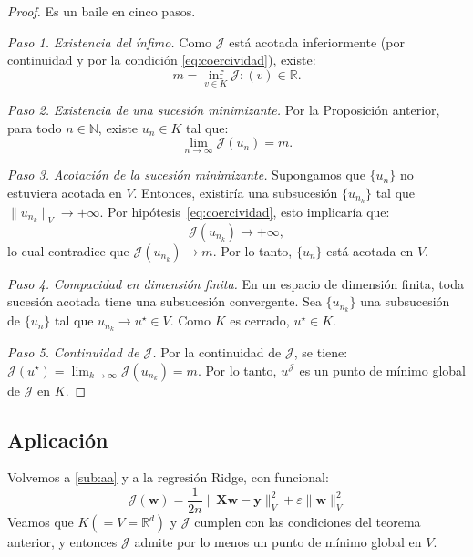 \documentclass[12pt]{book}
\theoremstyle{definition}
\theoremstyle{plain}
\theoremstyle{remark}
\begin{document}
\begin{proof} Es un baile en cinco pasos.

\medskip

\noindent \emph{Paso 1.} \emph{Existencia del ínfimo.}
   Como $\mathcal{J}$ está acotada inferiormente (por continuidad y por la condición  %
   \eqref{eq:coercividad}), existe:
   \[
   m = \inf_{v \in K} \mathcal{J}:(v) \in \mathbb{R}.
   \]

\medskip

\noindent \emph{Paso 2.}
\emph{Existencia de una sucesión minimizante.}
   Por %
   la Proposici\'on anterior, para
   todo $n \in \mathbb{N}$, existe $u_n \in K$ tal que:
   \[
   \lim_{n \to \infty} \mathcal{J}(u_n) = m.
   \]

\medskip

\noindent \emph{Paso 3.}
\emph{Acotación de la sucesión minimizante.}
   Supongamos que $\{u_n\}$ no estuviera acotada en $V$. Entonces, existiría una subsucesión $\{u_{n_k}\}$ tal que $\|u_{n_k}\|_V \to +\infty$. Por hipótesis~\eqref{eq:coercividad}, esto implicaría que:
   \[
   \mathcal{J}(u_{n_k}) \to +\infty,
   \]
   lo cual contradice que $\mathcal{J}(u_{n_k}) \to m$. Por lo tanto, $\{u_n\}$ está acotada en $V$.

\medskip

\noindent \emph{Paso 4.}
\emph{Compacidad en dimensión finita.}
   En un espacio de dimensión finita, toda sucesión acotada tiene una subsucesión convergente. Sea $\{u_{n_k}\}$ una subsucesión de $\{u_n\}$ tal que $u_{n_k} \to u^\star \in V$. Como $K$ es cerrado, $u^\star \in K$.

\medskip

\noindent \emph{Paso 5.}
\emph{Continuidad de $\mathcal{J}$.}
   Por la continuidad de $\mathcal{J}$, se tiene:
   $
   \mathcal{J}(u^\star) = \lim_{k \to \infty} \mathcal{J}(u_{n_k}) = m.
   $
   Por lo tanto, $u^\mathcal{J}$ es un punto de mínimo global de $\mathcal{J}$ en $K$.
\end{proof}

\subsection{Aplicación}

Volvemos a \ref{sub:aa} 
y a la
regresión Ridge, con funcional:
$$
\mathcal{J}(\mathbf{w}) = \frac{1}{2n} \| \mathbf{X}\mathbf{w} - \mathbf{y}\|_V^2 + \varepsilon \|\mathbf{w}\|_V^2
$$
Veamos que $K(=V=\mathbb{R}^d)$ y $\mathcal{J}$ cumplen con las condiciones del teorema anterior, y entonces $\mathcal{J}$ admite por lo menos un punto de mínimo global en $V$.
\end{document}

